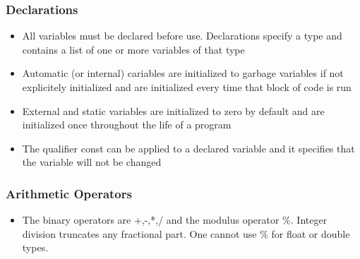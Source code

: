 \subsubsection{Declarations}
\begin{itemize}{--}
	\item All variables must be declared before use. Declarations specify a type and contains a list of one or more variables of that type
	\item Automatic (or internal) cariables are initialized to garbage variables if not explicitely initialized and are initialized every time that block of code is run
	\item External and static variables are initialized to zero by default and are initialized once throughout the life of a program
	\item The qualifier const can be applied to a declared variable and it specifies that the variable will not be changed 
\end{itemize}

\subsubsection{Arithmetic Operators}
\begin{itemize}{--}
	\item The binary operators are +,-,*,/ and the modulus operator \%. Integer division truncates any fractional part. One cannot use \% for float or double types.
\end{itemize}

\
